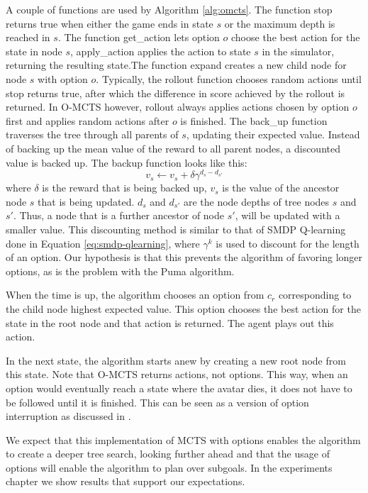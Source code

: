 A couple of functions are used by Algorithm \ref{alg:omcts}. The function
\textsf{stop} returns true when either the game ends in state $s$ or the maximum
depth is reached in $s$. The function \textsf{get\_action} lets option $o$
choose the best action for the state in node $s$, \textsf{apply\_action} applies
the action to state $s$ in the simulator, returning the resulting state.The
function \textsf{expand} creates a new child node for node $s$ with option $o$.
Typically, the \textsf{rollout} function chooses random actions until
\textsf{stop} returns true, after which the difference in score achieved by the
rollout is returned.  In O-MCTS however, \textsf{rollout} always applies actions
chosen by option $o$ first and applies random actions after $o$ is finished. The
\textsf{back\_up} function traverses the tree through all parents of $s$,
updating their expected value. Instead of backing up the mean value of the
reward to all parent nodes, a discounted value is backed up. The backup function
looks like this:
\begin{equation}
	v_s \gets v_s + \delta\gamma^{d_s-d_{s'}}
\end{equation}
where $\delta$ is the reward that is being backed up, $v_s$ is the value of the
ancestor node $s$ that is being updated. $d_s$ and $d_{s'}$ are the node depths
of tree nodes $s$ and $s'$. Thus, a node that is a further ancestor of node
$s'$, will be updated with a smaller value. This discounting method is similar
to that of SMDP Q-learning done in Equation \ref{eq:smdp-qlearning}, where
$\gamma^k$ is used to discount for the length of an option. Our hypothesis is
that this prevents the algorithm of favoring longer options, as is the problem
with the Puma algorithm.

When the time is up, the algorithm chooses an option from $c_r$ corresponding to
the child node highest expected value. This option chooses the best
action for the state in the root node and that action is returned. The agent
plays out this action. 

In the next state, the algorithm starts anew by creating a new root node from
this state. Note that O-MCTS returns actions, not options. This way, when an
option would eventually reach a state where the avatar dies, it does not have to
be followed until it is finished. This can be seen as a version of option
interruption as discussed in \cite{sutton1999between}.

We expect that this implementation of MCTS with options enables the algorithm to
create a deeper tree search, looking further ahead and that the usage of options
will enable the algorithm to plan over subgoals. In the experiments chapter we
show results that support our expectations.
